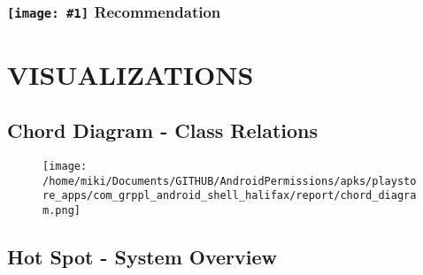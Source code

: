 \documentclass[12p]{article}
\newcommand{\icon}[1]{\texttt{[image: \#1]}}
\begin{document}
\subsubsection*{\protect\icon{/home/miki/Documents/GITHUB/AndroidPermissions/python/vulns/report_icons/basic_todo.png} Recommendation}

\cleardoublepage
\newpage
\section{VISUALIZATIONS}
\subsection{Chord Diagram - Class Relations}
\begin{figure}[H]
	\texttt{[image: /home/miki/Documents/GITHUB/AndroidPermissions/apks/playstore\_apps/com\_grppl\_android\_shell\_halifax/report/chord\_diagram.png]}\end{figure}\subsection{Hot Spot - System Overview}
\end{document}
